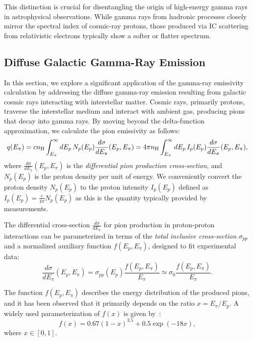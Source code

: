 This distinction is crucial for disentangling the origin of high-energy gamma rays in astrophysical observations. While gamma rays from hadronic processes closely mirror the spectral index of cosmic-ray protons, those produced via IC scattering from relativistic electrons typically show a softer or flatter spectrum.

\subsection{Diffuse Galactic Gamma-Ray Emission}

In this section, we explore a significant application of the gamma-ray emissivity calculation by addressing the diffuse gamma-ray emission resulting from galactic cosmic rays interacting with interstellar matter. Cosmic rays, primarily protons, traverse the interstellar medium and interact with ambient gas, producing pions that decay into gamma rays. By moving beyond the delta-function approximation, we calculate the pion emissivity as follows:  
%
\begin{equation}
q(E_\pi) = c n_{\rm H} \int_{E_\pi}^\infty dE_p \, N_p(E_p) \frac{d\sigma}{dE_\pi}(E_p, E_\pi) = 4 \pi n_{\rm H} \int_{E_\pi}^\infty dE_p \, I_p(E_p) \frac{d\sigma}{dE_\pi}(E_p, E_\pi),
\end{equation}
%
where \(\frac{d\sigma}{dE_\pi}(E_p, E_\pi)\) is the \emph{differential pion production cross-section}, and \(N_p(E_p) \) is the proton density per unit of energy.  
%
We conveniently convert the proton density \(N_p(E_p) \) to the proton intensity \( I_p(E_p) \) defined as \( I_p(E_p) =  \frac{c}{4\pi} N_p(E_p) \) as this is the quantity typically provided by measurements.

The differential cross-section \(\frac{d\sigma}{dE_\pi}\) for pion production in proton-proton interactions can be parameterized in terms of the \emph{total inclusive cross-section} \(\sigma_{pp}\) and a normalized auxiliary function \(f(E_p, E_\pi)\), designed to fit experimental data:  
\begin{equation}
\frac{d\sigma}{dE_\pi}(E_p, E_\pi) = \sigma_{pp}(E_p) \frac{f(E_p, E_\pi)}{E_\pi} \simeq \sigma_0 \frac{f(E_p, E_\pi)}{E_\pi}.
\end{equation}

The function \(f(E_p, E_\pi)\) describes the energy distribution of the produced pions, and it has been observed that it primarily depends on the ratio \(x = E_\pi / E_p\).
%
A widely used parameterization of \(f(x)\) is given by~\cite{Berezinskii1988sal}:
\begin{equation}
f(x) = 0.67 (1-x)^{3.5} + 0.5 \exp(-18x),
\end{equation}
where \(x \in [0, 1]\).  

